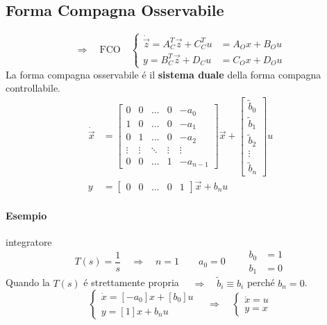 \documentclass[../main.tex]{subfiles}
\begin{document}
	\subsection{Forma Compagna Osservabile}
		\[
			\Rightarrow\quad\text{FCO}\quad
			\begin{cases}
				\dot{\vec z} = A_C^T \vec z + C_C^T u &= A_O x + B_O u\\
				y = B_C^T \vec z + D_C u &= C_O x + D_O u
			\end{cases}
		\]
		La forma compagna osservabile \'e il \textbf{sistema duale} della forma compagna controllabile.
		\[
			\begin{aligned}
				\dot{\vec x} &=
				\begin{bmatrix}
					0 & 0 & \dots & 0 & -a_0 \\
					1 & 0 & \dots & 0 & -a_1 \\
					0 & 1 & \dots & 0 & -a_2 \\
					\vdots & \vdots & \ddots & \vdots & \vdots \\
					0 & 0 & \dots & 1 & -a_{n-1}
				\end{bmatrix} \vec x+
				\begin{bmatrix}
					\tilde b_0\\
					\tilde b_1\\
					\tilde b_2\\
					\vdots\\
					\tilde b_n
				\end{bmatrix} u
				\\
				y &=
				\begin{bmatrix}
					0 & 0 & \dots & 0 & 1
				\end{bmatrix} \vec x + b_n u
			\end{aligned}
		\]
		
		\begin{mdframed}[style=Esempio]
			\paragraph{Esempio} integratore
				\[
					T(s) = \dfrac{1}{s} \quad\Rightarrow\quad n=1 \qquad
					a_0 = 0 \qquad
					\begin{aligned}
						b_0 &= 1\\
						b_1 &= 0
					\end{aligned}
				\]
				Quando la $ T(s) $ \'e strettamente propria $ \quad\Rightarrow\quad \tilde b_i \equiv b_i $ perch\'e $ b_n = 0 $.
				\[
					\begin{cases}
						\dot x = [-a_0] x + [b_0] u\\
						y = [1] x + b_n u
					\end{cases}
					\quad\Rightarrow\quad
					\begin{cases}
						\dot x = u\\
						y = x
					\end{cases}
				\]
		\end{mdframed}
	
\end{document}
